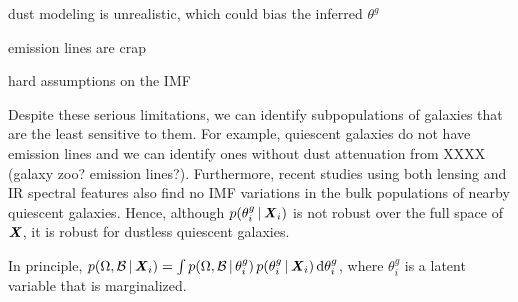 dust modeling is unrealistic, which could bias the inferred $\theta^g$

emission lines are crap

hard assumptions on the IMF

Despite these serious limitations, we can identify subpopulations of galaxies
that are the least sensitive to them.
For example, quiescent galaxies do not have emission lines and we can identify
ones without dust attenuation from XXXX (galaxy zoo? emission lines?).  
Furthermore, recent studies using both lensing and IR spectral features also
find no IMF variations in the bulk populations of nearby quiescent galaxies. 
Hence, although $p(\theta^g_i\,|\, {\textbf{\textit{X}}}_i)$ is not robust over the full
space of ${\textbf{\textit{X}}}$, it is robust for dustless quiescent galaxies.

In principle, $p(\Omega, \mathcal{B}\,|\, {\textbf{\textit{X}}_i}) = \int p(\Omega,
\mathcal{B}\,|\, \theta^g_i)\,p(\theta^g_i \,|\, {\textbf{\textit{X}}_i})\,{\rm
d}\theta^g_i$, where $\theta^g_i$ is a latent variable that is marginalized. 
